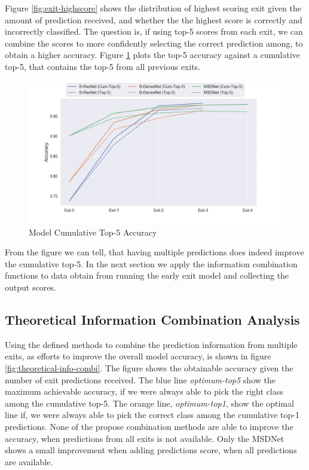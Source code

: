 Figure \ref{fig:exit-highscore} shows the distribution of highest scoring exit given the amount of prediction received, and whether the the highest score is correctly and incorrectly classified. The question is, if using top-5 scores from each exit, we can combine the scores to more confidently selecting the correct prediction among, to obtain a higher accuracy. Figure \ref{fig:top-5-cumulative} plots the top-5 accuracy against a cumulative top-5, that contains the top-5 from all previous exits. 

\begin{figure}
	\centering
	\includegraphics[width=.8\linewidth]{figures/edge/top5cumulative}
	\caption[Top-5 Cumulative]{Model Cumulative Top-5 Accuracy}
	\label{fig:top-5-cumulative}
\end{figure}

From the figure we can tell, that having multiple predictions does indeed improve the cumulative top-5. In the next section we apply the information combination functions to data obtain from running the early exit model and collecting the output scores. 

\subsection{Theoretical Information Combination Analysis}

Using the defined methods to combine the prediction information from multiple exits, as efforts to improve the overall model accuracy, is shown in figure \ref{fig:theoretical-info-combi}. The figure shows the obtainable accuracy given the number of exit predictions received. The blue line \textit{optimum-top5} show the maximum achievable accuracy, if we were always able to pick the right class among the cumulative top-5. The orange line, \textit{optimum-top1}, show the optimal line if, we were always able to pick the correct class among the cumulative top-1 predictions. None of the propose combination methods are able to improve the accuracy, when predictions from all exits is not available. Only the MSDNet shows a small improvement when adding predictions score, when all predictions are available.

